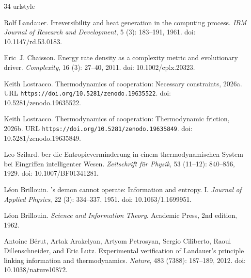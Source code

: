 \documentclass[11pt]{article}
\theoremstyle{plain}
\theoremstyle{definition}
\theoremstyle{remark}
\begin{document}
\begin{thebibliography}{34}
\providecommand{\natexlab}[1]{#1}
\providecommand{\url}[1]{\texttt{#1}}
\expandafter\ifx\csname urlstyle\endcsname\relax
  \providecommand{\doi}[1]{doi: #1}\else
  \providecommand{\doi}{doi: \begingroup \urlstyle{rm}\Url}\fi

Rolf Landauer.
\newblock Irreversibility and heat generation in the computing process.
\newblock \emph{IBM Journal of Research and Development}, 5
  (3): 183--191, 1961.
\newblock \doi{10.1147/rd.53.0183}.

Eric~J. Chaisson.
\newblock Energy rate density as a complexity metric and evolutionary driver.
\newblock \emph{Complexity}, 16 (3): 27--40, 2011.
\newblock \doi{10.1002/cplx.20323}.

\bibitem[Lostracco(2026{\natexlab{a}})]{TC-I}
Keith Lostracco.
\newblock Thermodynamics of cooperation: Necessary constraints,
  2026{\natexlab{a}}.
\newblock URL \url{https://doi.org/10.5281/zenodo.19635522}.
\newblock \doi{10.5281/zenodo.19635522}.

\bibitem[Lostracco(2026{\natexlab{b}})]{TC-IV}
Keith Lostracco.
\newblock Thermodynamics of cooperation: Thermodynamic friction,
  2026{\natexlab{b}}.
\newblock URL \url{https://doi.org/10.5281/zenodo.19635849}.
\newblock \doi{10.5281/zenodo.19635849}.

Leo Szilard.
ber die {Entropieverminderung} in einem thermodynamischen
  {System} bei {Eingriffen} intelligenter {Wesen}.
\newblock \emph{Zeitschrift f{\"u}r Physik}, 53 (11--12):
  840--856, 1929.
\newblock \doi{10.1007/BF01341281}.

L{\'e}on Brillouin.
's demon cannot operate: Information and entropy. {I}.
\newblock \emph{Journal of Applied Physics}, 22 (3):
  334--337, 1951.
\newblock \doi{10.1063/1.1699951}.

L{\'e}on Brillouin.
\newblock \emph{Science and Information Theory}.
\newblock Academic Press, 2nd edition, 1962.

Antoine B{\'e}rut, Artak Arakelyan, Artyom Petrosyan, Sergio Ciliberto, Raoul
  Dillenschneider, and Eric Lutz.
\newblock Experimental verification of {Landauer}'s principle linking
  information and thermodynamics.
\newblock \emph{Nature}, 483 (7388): 187--189, 2012.
\newblock \doi{10.1038/nature10872}.


\end{thebibliography}
\end{document}
